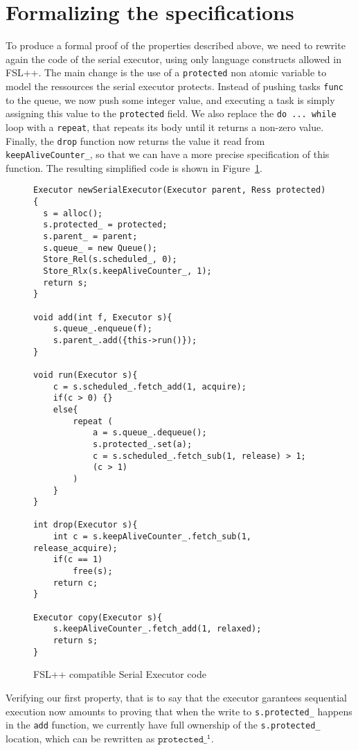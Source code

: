\section{Formalizing the specifications}

To produce a formal proof of the properties described above, we need to rewrite again the code of the serial executor, using only language constructs allowed in FSL++. The main change is the use of a \texttt{protected} non atomic variable to model the ressources the serial executor protects. Instead of pushing tasks \texttt{func} to the queue, we now push some integer value, and executing a task is simply assigning this value to the \texttt{protected} field. We also replace the \texttt{do ... while} loop with a \texttt{repeat}, that repeats its body until it returns a non-zero value. Finally, the \texttt{drop} function now returns the value it read from \texttt{keepAliveCounter\_}, so that we can have a more precise specification of this function. The resulting simplified code is shown in Figure~\ref{fig:serialExecCP}.

\begin{figure}
	\begin{lstlisting}
Executor newSerialExecutor(Executor parent, Ress protected){
  s = alloc();
  s.protected_ = protected;
  s.parent_ = parent;
  s.queue_ = new Queue();
  Store_Rel(s.scheduled_, 0);
  Store_Rlx(s.keepAliveCounter_, 1);
  return s;
}

void add(int f, Executor s){
	s.queue_.enqueue(f);
	s.parent_.add({this->run()});
}

void run(Executor s){
	c = s.scheduled_.fetch_add(1, acquire);
	if(c > 0) {}
	else{
		repeat (
			a = s.queue_.dequeue();
			s.protected_.set(a);
			c = s.scheduled_.fetch_sub(1, release) > 1;
			(c > 1)
		)
	}
}

int drop(Executor s){
	int c = s.keepAliveCounter_.fetch_sub(1, release_acquire);
	if(c == 1)
		free(s);
	return c;
}

Executor copy(Executor s){
	s.keepAliveCounter_.fetch_add(1, relaxed);
	return s;
}
	\end{lstlisting}


	\caption{FSL++ compatible Serial Executor code}
	\label{fig:serialExecCP}
\end{figure}

Verifying our first property, that is to say that the executor garantees sequential execution now amounts to proving that when the write to \texttt{s.protected\_} happens in the \texttt{add} function, we currently have full ownership of the \texttt{s.protected\_} location, which can be rewritten as $\mathtt{protected\_^1}$.

